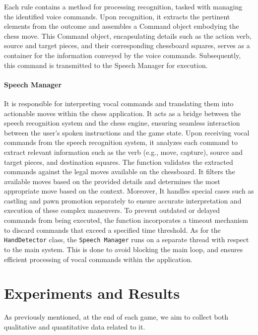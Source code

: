 \documentclass[a4paper, 11pt, twocolumn]{IEEEtran}
\begin{document}
    Each rule contains a method for processing recognition, tasked with managing the identified voice commands. Upon recognition, it extracts the pertinent elements from the outcome and assembles a Command object embodying the chess move. This Command object, encapsulating details such as the action verb, source and target pieces, and their corresponding chessboard squares, serves as a container for the information conveyed by the voice commands. Subsequently, this command is transmitted to the Speech Manager for execution.
    \paragraph*{Speech Manager} It is responsible for interpreting vocal commands and translating them into actionable moves within the chess application. It acts as a bridge between the speech recognition system and the chess engine, ensuring seamless interaction between the user's spoken instructions and the game state. Upon receiving vocal commands from the speech recognition system, it analyzes each command to extract relevant information such as the verb (e.g., move, capture), source and target pieces, and destination squares. The function validates the extracted commands against the legal moves available on the chessboard. It filters the available moves based on the provided details and determines the most appropriate move based on the context. Moreover, It handles special cases such as castling and pawn promotion separately to ensure accurate interpretation and execution of these complex maneuvers. To prevent outdated or delayed commands from being executed, the function incorporates a timeout mechanism to discard commands that exceed a specified time threshold. As for the \texttt{HandDetector} class, the \texttt{Speech Manager} runs on a separate thread with respect to the main system. This is done to avoid blocking the main loop, and ensures efficient processing of vocal commands within the application.
    \section{Experiments and Results} As previously mentioned, at the end of each game, we aim to collect both qualitative and quantitative data related to it. 
\end{document}
